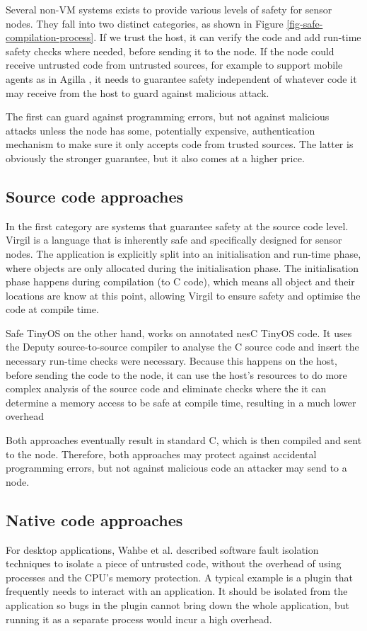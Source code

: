 Several non-VM systems exists to provide various levels of safety for sensor nodes. They fall into two distinct categories, as shown in Figure \ref{fig-safe-compilation-process}. If we trust the host, it can verify the code and add run-time safety checks where needed, before sending it to the node. If the node could receive untrusted code from untrusted sources, for example to support mobile agents as in Agilla \cite{Fok:2005bh}, it needs to guarantee safety independent of whatever code it may receive from the host to guard against malicious attack.

The first can guard against programming errors, but not against malicious attacks unless the node has some, potentially expensive, authentication mechanism to make sure it only accepts code from trusted sources. The latter is obviously the stronger guarantee, but it also comes at a higher price.

\subsection{Source code approaches}
In the first category are systems that guarantee safety at the source code level. Virgil \cite{Titzer:2006uy} is a language that is inherently safe and specifically designed for sensor nodes. The application is explicitly split into an initialisation and run-time phase, where objects are only allocated during the initialisation phase. The initialisation phase happens during compilation (to C code), which means all object and their locations are know at this point, allowing Virgil to ensure safety and optimise the code at compile time.

Safe TinyOS on the other hand, works on annotated nesC TinyOS code. It uses the Deputy \cite{Condit:2007uo} source-to-source compiler to analyse the C source code and insert the necessary run-time checks were necessary. Because this happens on the host, before sending the code to the node, it can use the host's resources to do more complex analysis of the source code and eliminate checks where the it can determine a memory access to be safe at compile time, resulting in a much lower overhead

Both approaches eventually result in standard C, which is then compiled and sent to the node. Therefore, both approaches may protect against accidental programming errors, but not against malicious code an attacker may send to a node.

\subsection{Native code approaches}
For desktop applications, Wahbe et al. described software fault isolation \cite{Wahbe:1994cj} techniques to isolate a piece of untrusted code, without the overhead of using processes and the CPU's memory protection. A typical example is a plugin that frequently needs to interact with an application. It should be isolated from the application so bugs in the plugin cannot bring down the whole application, but running it as a separate process would incur a high overhead.

